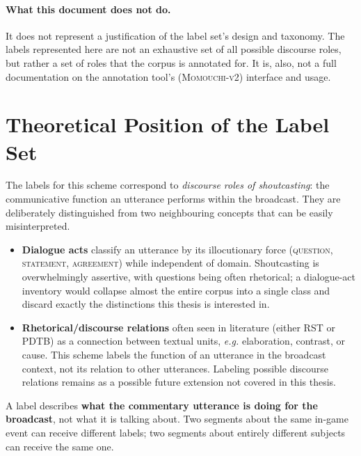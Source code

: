 \paragraph{What this document does not do.} It does not represent a justification of the label set's design and taxonomy. The labels represented here are not an exhaustive set of all possible discourse roles, but rather a set of roles that the corpus is annotated for. It is, also, not a full documentation on the annotation tool's (\textsc{Momouchi-v2}) interface and usage. 

\section{Theoretical Position of the Label Set}
\label{sec:position}

The labels for this scheme correspond to \emph{discourse roles of shoutcasting}: the communicative function an utterance performs within the broadcast. They are deliberately distinguished from two neighbouring concepts that can be easily misinterpreted.

\begin{itemize}
  \item \textbf{Dialogue acts} classify an utterance by its illocutionary force (\textsc{question}, \textsc{statement}, \textsc{agreement}) while independent of domain. Shoutcasting is overwhelmingly assertive, with questions being often rhetorical; a dialogue-act inventory would collapse almost the entire corpus into a single class and discard exactly the distinctions this thesis is interested in.
  \item \textbf{Rhetorical/discourse relations} often seen in literature (either RST or PDTB) as a connection between textual units, \textit{e.g.} elaboration, contrast, or cause. This scheme labels the function of an utterance in the broadcast context, not its relation to other utterances. Labeling possible discourse relations remains as a possible future extension not covered in this thesis.
\end{itemize}

\begin{agrulebox}
A label describes \textbf{what the commentary utterance is doing for the broadcast}, not what it is talking about. Two segments about the same in-game event can receive different labels; two segments about entirely different subjects can receive the same one.
\end{agrulebox}

